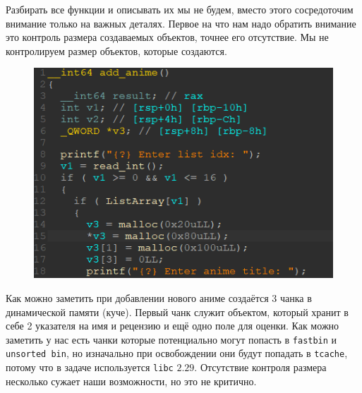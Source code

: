 \documentclass[idxtotoc,hyperref,openany,oneside]{files/pwn} %
\begin{document}
Разбирать все функции и описывать их мы не будем, вместо этого сосредоточим внимание только на важных деталях. Первое на что нам надо обратить внимание это контроль размера создаваемых объектов, точнее его отсутствие. Мы не контролируем размер объектов, которые создаются.
\begin{figure}[H]
\begin{center}
\includegraphics[width=1.0\linewidth]{files/mal-add-anime}
\end{center}
\label{fig:mal-add-anime}
\end{figure}

Как можно заметить при добавлении нового аниме создаётся 3 чанка в динамической памяти (куче). Первый чанк служит объектом, который хранит в себе 2 указателя на имя и рецензию и ещё одно поле для оценки. Как можно заметить у нас есть чанки которые потенциально могут попасть в \verb|fastbin| и \verb|unsorted bin|, но изначально при освобождении они будут попадать в \verb|tcache|, потому что в задаче используется \verb|libc| $2.29$. Отсутствие контроля размера несколько сужает наши возможности, но это не критично.
\end{document}
